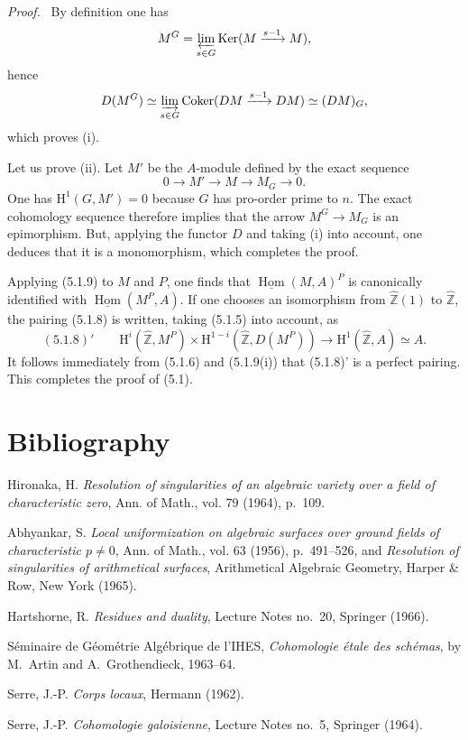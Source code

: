 \documentclass[11pt]{article}
\providecommand{\uHom}{\underline{\Hom}}
\newenvironment{prooftext}[1][Proof]{\par\noindent\emph{#1.}\ }{\par\medskip}
\renewcommand{\H}{\mathrm{H}}
\DeclareMathOperator{\Hom}{Hom}
\newcommand{\Z}{\mathbb{Z}}
\providecommand{\Ker}{\operatorname{Ker}}
\providecommand{\Coker}{\operatorname{Coker}}
\providecommand{\Hom}{\operatorname{Hom}}
\providecommand{\Ker}{\operatorname{Ker}}
\providecommand{\Coker}{\operatorname{Coker}}
\providecommand{\Ker}{\operatorname{Ker}}
\providecommand{\Coker}{\operatorname{Coker}}
\providecommand{\Z}{\mathbb Z}
\providecommand{\Hom}{\operatorname{Hom}}
\begin{document}
\begin{prooftext}[Proof]
By definition one has
\[
M^G=\varprojlim_{s\in G}\Ker(M\xrightarrow{s-1}M),
\]
hence
\[
D(M^G)\simeq \varinjlim_{s\in G}\Coker(DM\xrightarrow{s-1}DM)\simeq (DM)_G,
\]
which proves (i).

Let us prove (ii). Let $M'$ be the $A$-module defined by the exact sequence
\[
0\longrightarrow M'\longrightarrow M\longrightarrow M_G\longrightarrow0.
\]
One has $\H^1(G,M')=0$ because $G$ has pro-order prime to $n$. The exact cohomology sequence therefore implies that the arrow $M^G\to M_G$ is an epimorphism. But, applying the functor $D$ and taking (i) into account, one deduces that it is a monomorphism, which completes the proof.
\end{prooftext}

Applying (5.1.9) to $M$ and $P$, one finds that $\uHom(M,A)^P$ is canonically identified with $\uHom(M^P,A)$. If one chooses an isomorphism from $\widehat{\Z}(1)$ to $\widehat{\Z}$, the pairing (5.1.8) is written, taking (5.1.5) into account, as
\[
(5.1.8)'\qquad \H^i(\widehat{\Z},M^P)\times\H^{1-i}(\widehat{\Z},D(M^P))\longrightarrow\H^1(\widehat{\Z},A)\simeq A.
\]
It follows immediately from (5.1.6) and (5.1.9(i)) that (5.1.8)' is a perfect pairing. This completes the proof of (5.1).

\section*{Bibliography}

\begin{description}[leftmargin=2.5cm,style=nextline]
\item[{[2]}] Hironaka, H. \emph{Resolution of singularities of an algebraic variety over a field of characteristic zero}, Ann. of Math., vol. 79 (1964), p.~109.
\item[{[1]}] Abhyankar, S. \emph{Local uniformization on algebraic surfaces over ground fields of characteristic $p\ne0$}, Ann. of Math., vol. 63 (1956), p.~491--526, and \emph{Resolution of singularities of arithmetical surfaces}, Arithmetical Algebraic Geometry, Harper \& Row, New York (1965).
\item[{[H]}] Hartshorne, R. \emph{Residues and duality}, Lecture Notes no.~20, Springer (1966).
\item[{[SGAA]}] Séminaire de Géométrie Algébrique de l'IHES, \emph{Cohomologie étale des schémas}, by M.~Artin and A.~Grothendieck, 1963--64.
\item[{[CL]}] Serre, J.-P. \emph{Corps locaux}, Hermann (1962).
\item[{[CG]}] Serre, J.-P. \emph{Cohomologie galoisienne}, Lecture Notes no.~5, Springer (1964).
\end{description}
\end{document}

